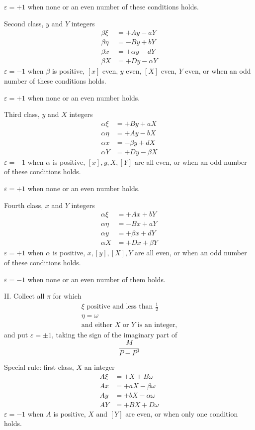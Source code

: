 $\varepsilon=+1$ when none or an even number of these conditions holds.

Second class, $y$ and $Y$ integers
\[
\begin{aligned}
\beta\xi&=+Ay-aY\\
\beta\eta&=-By+bY\\
\beta x&=+\alpha y-dY\\
\beta X&=+Dy-\alpha Y
\end{aligned}
\]
$\varepsilon=-1$ when $\beta$ is positive, $[x]$ even, $y$ even, $[X]$ even, $Y$ even, or when an odd number of these conditions holds.

$\varepsilon=+1$ when none or an even number holds.

Third class, $y$ and $X$ integers
\[
\begin{aligned}
\alpha\xi&=+By+aX\\
\alpha\eta&=+Ay-bX\\
\alpha x&=-\beta y+dX\\
\alpha Y&=+Dy-\beta X
\end{aligned}
\]
$\varepsilon=-1$ when $\alpha$ is positive, $[x],y,X,[Y]$ are all even, or when an odd number of these conditions holds.

$\varepsilon=+1$ when none or an even number holds.

Fourth class, $x$ and $Y$ integers
\[
\begin{aligned}
\alpha\xi&=+Ax+bY\\
\alpha\eta&=-Bx+aY\\
\alpha y&=+\beta x+dY\\
\alpha X&=+Dx+\beta Y
\end{aligned}
\]
$\varepsilon=+1$ when $\alpha$ is positive, $x,[y],[X],Y$ are all even, or when an odd number of these conditions holds.

$\varepsilon=-1$ when none or an even number of them holds.

II. Collect all $\pi$ for which
\[
\begin{array}{l}
\xi\text{ positive and less than }\frac12\\
\eta=\omega\\
\text{and either }X\text{ or }Y\text{ is an integer,}
\end{array}
\]
and put $\varepsilon=\pm1$, taking the sign of the imaginary part of
\[
\frac{M}{P-P^0}
\]

Special rule: first class, $X$ an integer
\[
\begin{aligned}
A\xi&=+X+B\omega\\
Ax&=+aX-\beta\omega\\
Ay&=+bX-\alpha\omega\\
AY&=+BX+D\omega
\end{aligned}
\]
$\varepsilon=-1$ when $A$ is positive, $X$ and $[Y]$ are even, or when only one condition holds.


